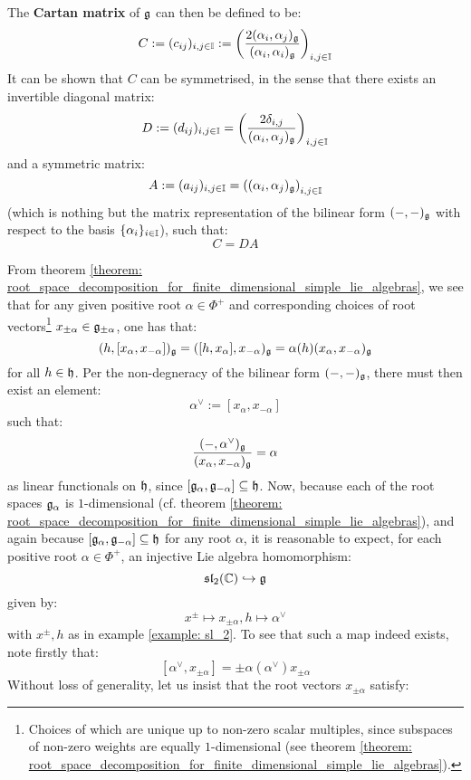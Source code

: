         The \textbf{Cartan matrix} of $\mathfrak{g}$ can then be defined to be:
            $$C := (c_{ij})_{i, j \in \mathbb{I}} := \left( \frac{2(\alpha_i, \alpha_j)_{\mathfrak{g}}}{(\alpha_i, \alpha_i)_{\mathfrak{g}}} \right)_{i, j \in \mathbb{I}}$$
        It can be shown that $C$ can be symmetrised, in the sense that there exists an invertible diagonal matrix:
            $$D := (d_{ij})_{i, j \in \mathbb{I}} = \left(\frac{2\delta_{i, j}}{(\alpha_i, \alpha_j)_{\mathfrak{g}}}\right)_{i, j \in \mathbb{I}}$$
        and a symmetric matrix:
            $$A := (a_{ij})_{i, j \in \mathbb{I}} = \left((\alpha_i, \alpha_j)_{\mathfrak{g}}\right)_{i, j \in \mathbb{I}}$$
        (which is nothing but the matrix representation of the bilinear form $(-, -)_{\mathfrak{g}}$ with respect to the basis $\{\alpha_i\}_{i \in \mathbb{I}}$), such that:
            $$C = DA$$

        From theorem \ref{theorem: root_space_decomposition_for_finite_dimensional_simple_lie_algebras}, we see that for any given positive root $\alpha \in \Phi^+$ and corresponding choices of root vectors\footnote{Choices of which are unique up to non-zero scalar multiples, since subspaces of non-zero weights are equally $1$-dimensional (see theorem \ref{theorem: root_space_decomposition_for_finite_dimensional_simple_lie_algebras}).} $x_{\pm\alpha} \in \mathfrak{g}_{\pm\alpha}$, one has that:
            $$(h, [x_{\alpha}, x_{-\alpha}])_{\mathfrak{g}} = ([h, x_{\alpha}], x_{-\alpha})_{\mathfrak{g}} = \alpha(h) (x_{\alpha}, x_{-\alpha})_{\mathfrak{g}}$$
        for all $h \in \mathfrak{h}$. Per the non-degneracy of the bilinear form $(-, -)_{\mathfrak{g}}$, there must then exist an element:
            $$\alpha^{\vee} := [x_{\alpha}, x_{-\alpha}]$$
        such that:
            $$\frac{(-, \alpha^{\vee})_{\mathfrak{g}}}{(x_{\alpha}, x_{-\alpha})_{\mathfrak{g}}} = \alpha$$
        as linear functionals on $\mathfrak{h}$, since $[\mathfrak{g}_{\alpha}, \mathfrak{g}_{-\alpha}] \subseteq \mathfrak{h}$. Now, because each of the root spaces $\mathfrak{g}_{\alpha}$ is $1$-dimensional (cf. theorem \ref{theorem: root_space_decomposition_for_finite_dimensional_simple_lie_algebras}), and again because $[\mathfrak{g}_{\alpha}, \mathfrak{g}_{-\alpha}] \subseteq \mathfrak{h}$ for any root $\alpha$, it is reasonable to expect, for each positive root $\alpha \in \Phi^+$, an injective Lie algebra homomorphism:
            $$\mathfrak{sl}_2(\mathbb{C}) \hookrightarrow \mathfrak{g}$$
        given by:
            $$x^{\pm} \mapsto x_{\pm \alpha}, h \mapsto \alpha^{\vee}$$
        with $x^{\pm}, h$ as in example \ref{example: sl_2}. To see that such a map indeed exists, note firstly that:
            $$[\alpha^{\vee}, x_{\pm \alpha}] = \pm \alpha(\alpha^{\vee}) x_{\pm \alpha}$$
        Without loss of generality, let us insist that the root vectors $x_{\pm \alpha}$ satisfy:
